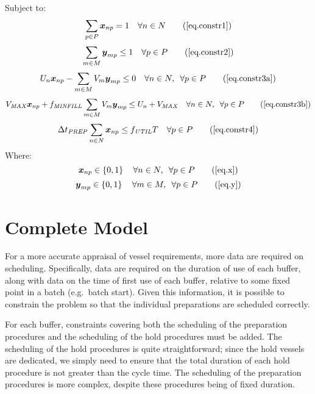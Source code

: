 Subject to:
\begin{equation}
    \sum_{p \in P} \boldsymbol{x}_{np} = 1 \quad \forall n \in N
    \tag{\ref{eq.constr1}}
\end{equation}
\begin{equation}
    \sum_{m \in M} \boldsymbol{y}_{mp} \le 1 \quad \forall p \in P
    \tag{\ref{eq.constr2}}
\end{equation}
\begin{equation}
    U_{n} \boldsymbol{x}_{np} - \sum_{m \in M} V_{m} \boldsymbol{y}_{mp} \le 0
    \quad \forall n \in N, \enspace \forall p \in P
    \tag{\ref{eq.constr3a}}
\end{equation}
\begin{equation}
    V_{\mathit{MAX}} \boldsymbol{x}_{np} + f_{\mathit{MINFILL}} \sum_{m \in M}
    V_{m} \boldsymbol{y}_{mp} \le U_{n} + V_{\mathit{MAX}} \quad \forall n \in
    N, \enspace \forall p \in P
    \tag{\ref{eq.constr3b}}
\end{equation}
\begin{equation}
    \Delta t_{\mathit{PREP}} \sum_{n \in N} \boldsymbol{x}_{np} \le
    f_{\mathit{UTIL}} T \quad \forall p \in P
    \tag{\ref{eq.constr4}}
\end{equation}
Where:
\begin{equation}
    \boldsymbol{x}_{np} \in \left\{ 0, 1 \right\} \quad \forall n \in N,
    \enspace \forall p \in P
    \tag{\ref{eq.x}}
\end{equation}
\begin{equation}
    \boldsymbol{y}_{mp} \in \left\{ 0, 1 \right\} \quad \forall m \in M,
    \enspace \forall p \in P
    \tag{\ref{eq.y}}
\end{equation}

\section{Complete Model}\label{S.completemodel}

For a more accurate appraisal of vessel requirements, more data are required
on scheduling.
Specifically, data are required on the duration of use of each buffer, along
with data on the time of first use of each buffer, relative to some fixed point
in a batch (e.g.\ batch start).
Given this information, it is possible to constrain the problem so that the
individual preparations are scheduled correctly.

For each buffer, constraints covering both the scheduling of the preparation
procedures and the scheduling of the hold procedures must be added.
The scheduling of the hold procedures is quite straightforward; since the hold
vessels are dedicated, we simply need to ensure that the total duration of each
hold procedure is not greater than the cycle time.
The scheduling of the preparation procedures is more complex, despite these
procedures being of fixed duration.

